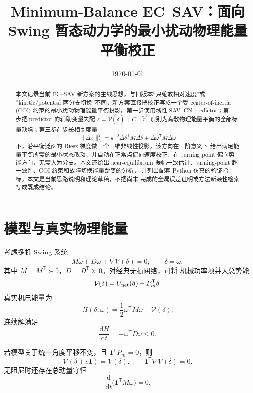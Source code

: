 \documentclass[UTF8,11pt,a4paper]{ctexart}
\title{Minimum-Balance EC--SAV：面向 Swing 暂态动力学的最小扰动物理能量平衡校正}
\author{}
\date{\today}
\theoremstyle{definition}
\theoremstyle{remark}
\newcommand{\T}{\mathsf{T}}
\newcommand{\one}{\bm 1}
\newcommand{\dd}{\mathrm d}
\newcommand{\V}{\mathcal V}
\newcommand{\wt}{\widetilde}
\begin{document}
\maketitle

\begin{abstract}
本文记录当前 EC--SAV 新方案的主线思想。与旧版本“只缩放相对速度”或
“kinetic/potential 两分支切换”不同，新方案直接把校正写成一个受
center-of-inertia (COI) 约束的最小扰动物理能量平衡投影。第一步使用线性
SAV--CN predictor；第二步把 predictor 的辅助变量失配
\(
\varepsilon=\V(\wt\delta)+C-\wt r^2
\)
识别为离散物理能量平衡的全部标量缺陷；第三步在步长相关度量
\[
 \|\Delta x\|_h^2
 =h^{-2}\Delta\delta^\T M\Delta\delta
 +\Delta\omega^\T M\Delta\omega
\]
下，沿平衡泛函的 Riesz 梯度做一个一维非线性投影。该方向在一阶意义下
给出满足能量平衡所需的最小状态改动，并自动在正常点偏向速度校正、在
turning point 偏向势能方向，无需人为分支。本文还给出 near-equilibrium
振幅一致估计、turning-point 超一致性、COI 约束和故障切换能量跳变的分析，
并列出配套 Python 仿真的验证指标。本文是当前思路说明和理论草稿，不把尚未
完成的全局误差证明或方法新颖性检索写成既成结论。
\end{abstract}

\section{模型与真实物理能量}

考虑多机 Swing 系统
\begin{equation}
 M\dot\omega+D\omega+\nabla \V(\delta)=0,
 \qquad
 \dot\delta=\omega,
 \label{eq:swing}
\end{equation}
其中 \(M=M^\T\succ0\)，\(D=D^\T\succeq0\)。对经典无损网络，可将
机械功率项并入总势能
\begin{equation}
 \V(\delta)
 =
 U_{\rm net}(\delta)-P_m^\T\delta .
\end{equation}
真实机电能量为
\begin{equation}
 H(\delta,\omega)
 =
 \frac12\omega^\T M\omega+\V(\delta).
 \label{eq:physical-energy}
\end{equation}
连续解满足
\begin{equation}
 \frac{\dd H}{\dd t}
 =
 -\omega^\T D\omega\le0.
 \label{eq:continuous-balance}
\end{equation}

若模型关于统一角度平移不变，且 \(\one^\T P_m=0\)，则
\[
 \V(\delta+c\one)=\V(\delta),
 \qquad
 \one^\T\nabla\V(\delta)=0.
\]
无阻尼时还存在总动量守恒
\[
 \frac{\dd}{\dd t}\bigl(\one^\T M\omega\bigr)=0.
\]
\end{document}
